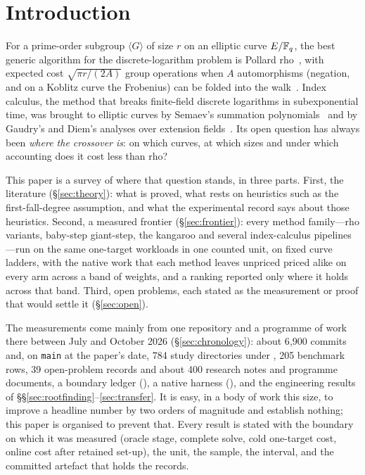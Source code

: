 \section{Introduction}\label{sec:intro}

For a prime-order subgroup $\langle G\rangle$ of size $r$ on an elliptic
curve $E/\mathbb{F}_q$, the best generic algorithm for the discrete-logarithm
problem is Pollard rho~\cite{pollard1978,vanoorschot1999}, with expected
cost $\sqrt{\pi r/(2A)}$ group operations when $A$ automorphisms (negation,
and on a Koblitz curve the Frobenius) can be folded into the
walk~\cite{wiener1998,gallant2000}. Index calculus, the method that breaks
finite-field discrete logarithms in subexponential time, was brought to
elliptic curves by Semaev's summation polynomials~\cite{semaev2004} and by
Gaudry's and Diem's analyses over extension
fields~\cite{gaudry2009,diem2011}. Its open question has always been
\emph{where the crossover is}: on which curves, at which sizes and under
which accounting does it cost less than rho?

This paper is a survey of where that question stands, in three parts.
First, the literature (\S\ref{sec:theory}): what is proved, what rests on
heuristics such as the first-fall-degree assumption, and what the
experimental record says about those heuristics. Second, a measured
frontier (\S\ref{sec:frontier}): every method family---rho variants,
baby-step giant-step, the kangaroo and several index-calculus
pipelines---run on the same one-target workloads in one counted unit, on
fixed curve ladders, with the native work that each method leaves unpriced
priced alike on every arm across a band of weights, and a ranking reported
only where it holds across that band. Third, open problems, each stated as
the measurement or proof that would settle it (\S\ref{sec:open}).

The measurements come mainly from one repository and a programme of work
there between July and October 2026 (\S\ref{sec:chronology}): about
6{,}900 commits and, on \texttt{main} at the paper's date, 784 study
directories under , 205 benchmark rows, 39 open-problem
records and about 400 research notes and programme documents, a boundary ledger
(), a native harness
(), and the engineering results of
\S\S\ref{sec:rootfinding}--\ref{sec:transfer}. It is easy, in a body of
work this size, to improve a headline number by two orders of magnitude
and establish nothing; this paper is organised to prevent that. Every
result is stated with the boundary on which it was measured (oracle stage,
complete solve, cold one-target cost, online cost after retained set-up),
the unit, the sample, the interval, and the committed artefact that holds
the records.

